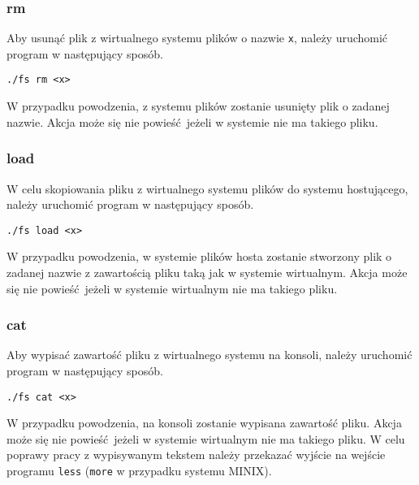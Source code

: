 \documentclass{mwrep}
\begin{document}
\subsubsection{rm}
Aby usunąć plik z wirtualnego systemu plików o nazwie \texttt{x}, należy uruchomić program w następujący sposób.
\begin{center}
    \texttt{./fs rm <x>}
\end{center}
W przypadku powodzenia, z systemu plików zostanie usunięty plik o zadanej nazwie.
Akcja może się nie powieść jeżeli w systemie nie ma takiego pliku.

\subsubsection{load}
W celu skopiowania pliku z wirtualnego systemu plików do systemu hostującego, należy uruchomić program w następujący sposób. 
\begin{center}
    \texttt{./fs load <x>}
\end{center}
W przypadku powodzenia, w systemie plików hosta zostanie stworzony plik o zadanej nazwie z zawartością pliku taką jak
w systemie wirtualnym.
Akcja może się nie powieść jeżeli w systemie wirtualnym nie ma takiego pliku.

\subsubsection{cat}
Aby wypisać zawartość pliku z wirtualnego systemu na konsoli, należy uruchomić program w następujący sposób.
\begin{center}
    \texttt{./fs cat <x>}
\end{center}
W przypadku powodzenia, na konsoli zostanie wypisana zawartość pliku. 
Akcja może się nie powieść jeżeli w systemie wirtualnym nie ma takiego pliku. W celu poprawy pracy z wypisywanym 
tekstem należy przekazać wyjście na wejście programu \texttt{less} (\texttt{more} w przypadku systemu MINIX).
\end{document}

